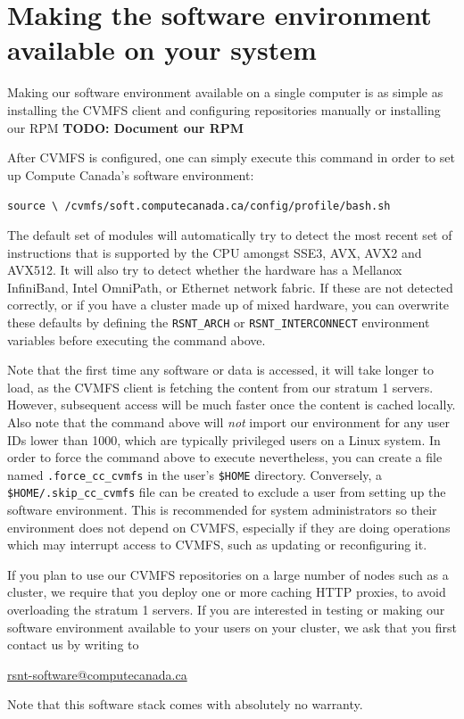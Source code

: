 \documentclass[sigconf]{acmart}
\begin{document}
\section{Making the software environment available on your system}
\label{sec:Making_it_available}
Making our software environment available on a single computer is as simple as installing the CVMFS client and configuring repositories manually or installing our RPM
\textbf{TODO: Document our RPM}

After CVMFS is configured, one can simply execute this command in order to set up Compute Canada's software environment: 

\begin{center}
\texttt{source \textbackslash \linebreak
/cvmfs/soft.computecanada.ca/config/profile/bash.sh}
\end{center}

The default set of modules will automatically try to detect the most recent set of instructions that is supported by the CPU amongst  SSE3, AVX, AVX2 and AVX512. It will also try to detect whether the hardware has a Mellanox InfiniBand, Intel OmniPath, or Ethernet network fabric. If these are not detected correctly, or if you have a cluster made up of mixed hardware, you can overwrite these defaults by defining the \texttt{RSNT\_ARCH} or \texttt{RSNT\_INTERCONNECT} environment variables before executing the command above. 

Note that the first time any software or data is accessed, it will take longer to load, as the CVMFS client is fetching the content from our stratum 1 servers. However, subsequent access will be much faster once the content is cached locally. 
Also note that the command above will {\it not} import our environment for any user IDs lower than 1000, which are typically privileged users on a Linux system. In order to force the command above to execute nevertheless, you can create a file named \texttt{.force\_cc\_cvmfs} in the user's \texttt{\$HOME} directory. Conversely, a \texttt{\$HOME/.skip\_cc\_cvmfs} file can be created to exclude a user from setting up the software environment. This is recommended for system administrators so their environment does not depend on CVMFS, especially if they are doing operations which may interrupt access to CVMFS, such as updating or reconfiguring it.

If you plan to use our CVMFS repositories on a large number of nodes such as a cluster, we require that you deploy one or more caching HTTP proxies, to avoid overloading the stratum 1 servers. If you are interested in testing or making our software environment available to your users on your cluster, we ask that you first contact us by writing to 
\begin{center}
\url{rsnt-software@computecanada.ca}    
\end{center}
Note that this software stack comes with absolutely no warranty. 
\end{document}
